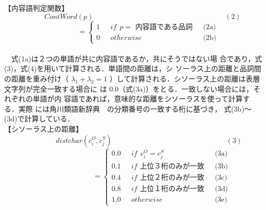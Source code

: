 【内容語判定関数】
$$ \ \ \ \ \ \ \ \ \ \ \ \ ContWord(p) \ \ \ \ \ \ \ \ \ \ \ \ \ \ \ \ \ \ \ \ \ \ \ \ \ \ \ \ \ \ \ \ \ \ \ \ \ \ \ \ \ \ \ \ \ \ \ \ \ \ \ \ \ \ \ \ \ \ \ \ \ \ \ \ \ \ \ \ \ \ \ \ \ \ \ \ \ \ \ \ \ \ \ (2) $$
\[ \ \ \ \ \ \ \ \ \ \ \ \ \ \ \ \ \ \ \ = \left\{ \begin{array}{llr}
        1 & \mbox{ $if \ \ p=$ 内容語である品詞 \ \ \ \ \ \ \ \ \ \ \ \ \ \ \ \ \ \ \ \ \ \ }
          & \mbox{ \ \ \ \ \ \ \ \ \ \ \ \ \ \ \ \ \ \ \ \ \ \ \ \ \ \ \ \ (2a)} \\
        0 & \mbox{ $otherwise$ }
          & \mbox{ \ \ \ \ \ \ \ \ \ \ \ \ \ \ \ \ \ \ \ \ \ \ \ \ \ \ \ \ (2b)}
          \end{array}
  \right. \]
\vspace{8mm}\\
　式(1a)は２つの単語が共に内容語であるか，共にそうではない場
合であり，式(3)，式(4)を用いて計算される．単語間の距離は，シ
ソーラス上の距離と品詞間の距離を重み付け（ $\lambda _1 + \lambda _2 =1$ ）して計算される．シソーラス上の距離は表層文字列が完全一致する場合に
は 0.0（式(3a)）をとる．一致しない場合には，それぞれの単語が内
容語であれば，意味的な距離をシソーラスを使って計算する．実際
には角川類語新辞典~\cite{Oono97}~の分類番号の一致する桁に基づき，
式(3b)〜(3d)で計算している．
\vspace{8mm}\\
【シソーラス上の距離】
$$ \ \ \ \ \ \ \ \ \ \ \ \ \ \ \ \ \ \ \ \ distchar(c^O_i, c^S_j) \ \ \ \ \ \ \ \ \ \ \ \ \ \ \ \ \ \ \ \ \ \ \ \ \ \ \ \ \ \ \ \ \ \ \ \ \ \ \ \ \ \ \ \ \ \ \ \ \ \ \ \ \ \ \ \ \ \ \ \ \ \ \ \ \ \ \ \ \ \ \ \ (3) $$
\[ \ \ \ \ \ \ \ \ \ \ \ \ \ \ \ \ \ \ \ \ \ \ \ \ \ \ \ \ \ \ \ \ \ \ \ \ = \left\{ \begin{array}{llr}
        0.0 & \mbox{ $if \ \ c^O_i=c^S_j$ \ \ \ \ \ \ \ \ }
            & \mbox{ \ \ \ \ \ \ \ \ \ \ \ \ \ \ \ \ \ \ \ \ \ \ \ \ \ \ \ \ \ \ \ \ (3a)} \\
        0.1 & \mbox{ $if$ 上位３桁のみが一致 \ \ \ \ \ \ \ \ }
            & \mbox{ \ \ \ \ \ \ \ \ \ \ \ \ \ \ \ \ \ \ \ \ \ \ \ \ \ \ \ \ \ \ \ \ (3b)} \\
        0.4 & \mbox{ $if$ 上位２桁のみが一致 \ \ \ \ \ \ \ \ }
            & \mbox{ \ \ \ \ \ \ \ \ \ \ \ \ \ \ \ \ \ \ \ \ \ \ \ \ \ \ \ \ \ \ \ \ (3c)} \\
        0.8 & \mbox{ $if$ 上位１桁のみが一致 \ \ \ \ \ \ \ \ }
            & \mbox{ \ \ \ \ \ \ \ \ \ \ \ \ \ \ \ \ \ \ \ \ \ \ \ \ \ \ \ \ \ \ \ \ (3d)} \\
        1.0 & \mbox{ $otherwise$ \ \ \ \ \ \ \ \ }
            & \mbox{ \ \ \ \ \ \ \ \ \ \ \ \ \ \ \ \ \ \ \ \ \ \ \ \ \ \ \ \ \ \ \ \ (3e)}
          \end{array}
  \right. \]
